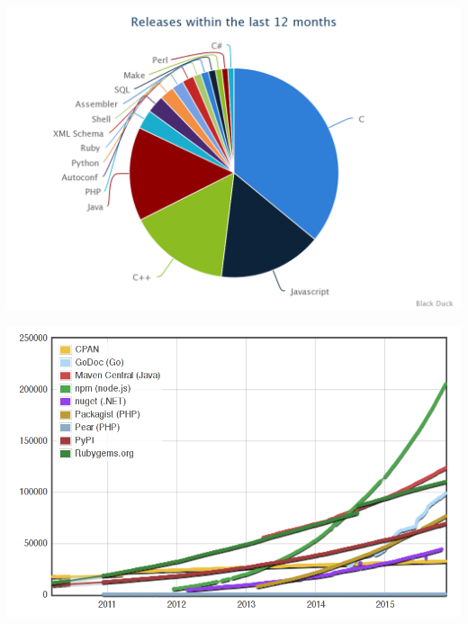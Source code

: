 \includegraphics[width=0.9\linewidth]{../../data/js-trends/black-duck-15}

\includegraphics[width=0.9\linewidth]{../../data/js-trends/modulecounts}



